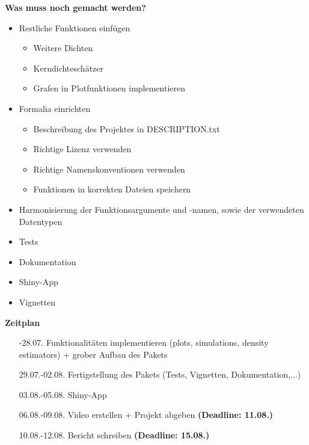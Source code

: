 \documentclass{scrartcl}
\begin{document}
\noindent\textbf{Was muss noch gemacht werden?}
\begin{itemize}
	\item Restliche Funktionen einfügen
	\begin{itemize}
		\item Weitere Dichten
		\item Kerndichteschätzer
		\item Grafen in Plotfunktionen implementieren
	\end{itemize}
	
	\item Formalia einrichten
	\begin{itemize}
		\item Beschreibung des Projektes in DESCRIPTION.txt
		\item Richtige Lizenz verwenden
		\item Richtige Namenskonventionen verwenden
		\item Funktionen in korrekten Dateien speichern
	\end{itemize}

	\item Harmonisierung der Funktionsargumente und -namen, sowie der verwendeten Datentypen
	\item Tests
	\item Dokumentation
	\item Shiny-App
	\item Vignetten
\end{itemize}


\noindent\textbf{Zeitplan}
\begin{itemize}
	\item[-28.07.] Funktionalitäten implementieren (plots, simulations, density estimators) + grober Aufbau des Pakets
	\item[29.07.-02.08.] Fertigstellung des Pakets (Tests, Vignetten, Dokumentation,...)
	\item[03.08.-05.08.] Shiny-App
	\item[06.08.-09.08.] Video erstellen + Projekt abgeben \textbf{(Deadline: 11.08.)}
	\item[10.08.-12.08.] Bericht schreiben \textbf{(Deadline: 15.08.)}
\end{itemize}
     
\end{document}
